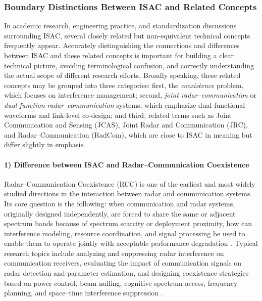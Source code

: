 \subsubsection{Boundary Distinctions Between ISAC and Related Concepts}
\label{subsubsec:ch1-boundary-distinction}

In academic research, engineering practice, and standardization discussions surrounding ISAC, several closely related but non-equivalent technical concepts frequently appear. Accurately distinguishing the connections and differences between ISAC and these related concepts is important for building a clear technical picture, avoiding terminological confusion, and correctly understanding the actual scope of different research efforts. Broadly speaking, these related concepts may be grouped into three categories: first, the \emph{coexistence} problem, which focuses on interference management; second, \emph{joint radar--communication} or \emph{dual-function radar--communication} systems, which emphasize dual-functional waveforms and link-level co-design; and third, related terms such as Joint Communication and Sensing (JCAS), Joint Radar and Communication (JRC), and Radar--Communication (RadCom), which are close to ISAC in meaning but differ slightly in emphasis.

\paragraph{1) Difference between ISAC and Radar--Communication Coexistence}

\begin{sloppypar}
Radar--Communication Coexistence (RCC) is one of the earliest and most widely studied directions in the interaction between radar and communication systems. Its core question is the following: when communication and radar systems, originally designed independently, are forced to share the same or adjacent spectrum bands because of spectrum scarcity or deployment proximity, how can interference modeling, resource coordination, and signal processing be used to enable them to operate jointly with acceptable performance degradation \cite{Chiriyath2017RadarCommCoexistence,Liu2020JointRadarComm}. Typical research topics include analyzing and suppressing radar interference on communication receivers, evaluating the impact of communication signals on radar detection and parameter estimation, and designing coexistence strategies based on power control, beam nulling, cognitive spectrum access, frequency planning, and space--time interference suppression \cite{Deng2013InterferenceMitigation,Sodagari2012ProjectionBasedCoexistence,Zheng2019RadarCommunicationCoexistence}.
\end{sloppypar}

